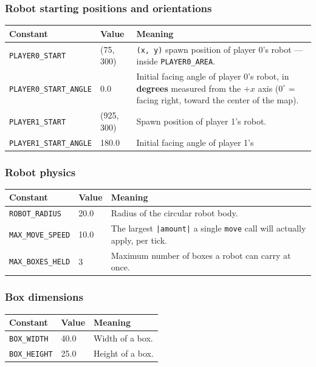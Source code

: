 \documentclass[11pt,a4paper]{article}
\newcommand{\code}[1]{\texttt{#1}}
\newcommand{\func}[1]{\texttt{#1}}
\begin{document}
\subsubsection*{Robot starting positions and orientations}
\begin{longtable}{p{4.7cm}p{2cm}p{8cm}}
\toprule
\textbf{Constant} & \textbf{Value} & \textbf{Meaning} \\
\midrule
\endhead
\code{PLAYER0\_START} & (75, 300) & \code{(x, y)} spawn position of player
    0's robot --- inside \code{PLAYER0\_AREA}. \\
\code{PLAYER0\_START\_ANGLE} & 0.0 & Initial facing angle of player 0's
    robot, in \textbf{degrees} measured from the $+x$ axis ($0^\circ$ = facing
    right, toward the center of the map). \\
\code{PLAYER1\_START} & (925, 300) & Spawn position of player 1's robot. \\
\code{PLAYER1\_START\_ANGLE} & 180.0 & Initial facing angle of player 1's \\
\bottomrule
\end{longtable}

\subsubsection*{Robot physics}
\begin{longtable}{p{4.7cm}p{2cm}p{8cm}}
\toprule
\textbf{Constant} & \textbf{Value} & \textbf{Meaning} \\
\midrule
\endhead
\code{ROBOT\_RADIUS} & 20.0 & Radius of the circular robot body. \\
\code{MAX\_MOVE\_SPEED} & 10.0 & The largest \code{|amount|} a single
    \func{move} call will actually apply, per tick. \\
\code{MAX\_BOXES\_HELD} & 3 & Maximum number of boxes a robot can carry at
    once. \\
\bottomrule
\end{longtable}

\subsubsection*{Box dimensions}
\begin{longtable}{p{4.7cm}p{2cm}p{8cm}}
\toprule
\textbf{Constant} & \textbf{Value} & \textbf{Meaning} \\
\midrule
\endhead
\code{BOX\_WIDTH} & 40.0 & Width of a box. \\
\code{BOX\_HEIGHT} & 25.0 & Height of a box. \\
\bottomrule
\end{longtable}
\end{document}
